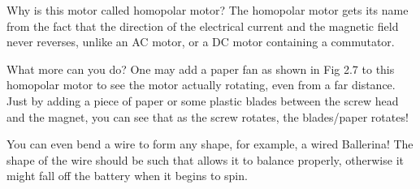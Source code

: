 Why is this motor called homopolar motor? The homopolar motor gets its name from the fact that the direction of the electrical
current and the magnetic field never reverses, unlike an AC motor, or a DC motor containing a commutator.

What more can you do? One may add a paper fan as shown in Fig 2.7 to this homopolar motor to see the motor actually rotating, 
even from a far distance. Just by adding a piece of paper or some plastic blades between the screw head and the magnet, you 
can see that as the screw rotates, the blades/paper rotates!

You can even bend a wire to form any shape, for example, a wired Ballerina! The shape of the wire should be such that allows 
it to balance properly, otherwise it might fall off the battery when it begins to spin.